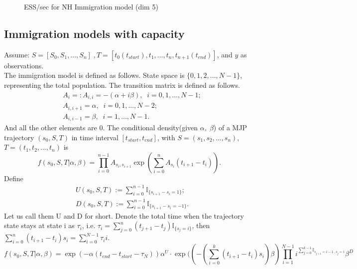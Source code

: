 \begin{figure}[H]
\begin{minipage}[!hp]{0.45\linewidth}
    \vspace{-0 in}
     \label{fig:ESS_pc_5}
  \end{minipage}
    \caption{ESS/sec for NH Immigration model (dim 5)}
  \end{figure}

  \subsection{Immigration models with capacity}
\noindent Assume: $S = [S_0,S_1, ...,S_n] \;, T = [t_0(t_{start}), t_1,...,t_n, t_{n+1}(t_{end})]$, and $y$ as observations.\\
The immigration model is defined as follows. State space is $\{0, 1, 2, ..., N - 1 \}$, representing the total population. The transition matrix is defined as follows. 
\begin{align*}
&A_i =: A_{i,i} = -(\alpha + i\beta), \; \; i =0,1,...,N - 1 ;\\
&A_{i, i+1} = \alpha, \; \; i =0,1,...,N-2;\\
&A_{i, i-1}  = \beta, \; \;  i =1,...,N - 1.
\end{align*} And all the other elements are $0$.
The conditional density(given $\alpha,\; \beta$) of a MJP trajectory $(s_0, S, T)$ in time interval $[t_{start}, t_{end}]$, with $S=(s_1, s_2,..., s_n)$, $T=(t_1, t_2,..., t_n)$ is 
$$f(s_0,S,T| \alpha, \beta) = \prod_{i=0}^{n-1} A_{s_i, s_{i+1}} \exp(\sum_{i=0}^{n} A_{s_i}(t_{i+1} - t_{i})).$$
Define
\begin{align*}
&U(s_0, S, T):= \sum_{i=0}^{n-1} \mathbb{I}_{\{s_{i+1} - s_i = 1\}} ; \\
&D(s_0, S, T):= \sum_{i=0}^{n-1} \mathbb{I}_{\{s_{i+1} - s_i = -1\}}.
\end{align*}
Let us call them U and D for short. Denote the total time when the trajectory state stays at state i as $\tau_i$, i.e. $\tau_i = \sum_{j=0}^{n} (t_{j+1} -t_j)\mathbb{I}_{\{s_j = i\}}$, then $\sum_{i=0}^n (t_{i+1} - t_i)s_i = \sum_{i=0}^{N - 1} \tau_ii.$
$$f(s_0,S,T| \alpha, \beta) = \exp(-\alpha(t_{end} - t_{start}- \tau_N) )\alpha^U \cdot  \exp((-(\sum_{i=0}^k (t_{i+1} - t_i)s_i)\beta) \prod_{i=1}^{N - 1} i^{\sum_{j=0}^{k-1}\mathbb{I}_{s_{j+1} = i -1 \;,  s_j = i} }   \beta^D$$\\
